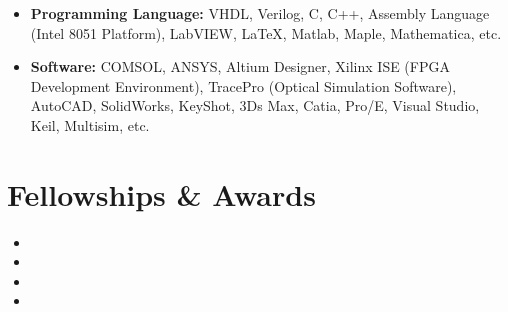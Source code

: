 \documentclass[11pt,a4paper,sans]{moderncv}         %
\begin{document}
\begin{itemize}

	\item \textbf{Programming Language:} VHDL, Verilog, C, C++, Assembly Language (Intel 8051 Platform), LabVIEW, \LaTeX, Matlab, Maple, Mathematica, etc.

	      \vspace{2pt}

	\item \textbf{Software:} COMSOL, ANSYS, Altium Designer, Xilinx ISE (FPGA Development Environment), TracePro (Optical Simulation Software), AutoCAD, SolidWorks, KeyShot, 3Ds Max, Catia, Pro/E, Visual Studio, Keil, Multisim, etc.

\end{itemize}

\section{Fellowships \& Awards}

\vspace{3pt}

\begin{itemize}

	\item{}

	\item{}

	\item{}

	\item{}

\end{itemize}
\end{document}
